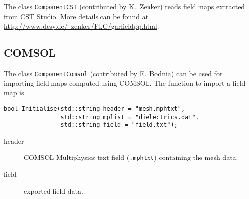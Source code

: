 The class \texttt{ComponentCST} (contributed by K.~Zenker) reads field maps 
extracted from CST Studio. More details can be found at 
\href{http://www.desy.de/~zenker/FLC/garfieldpp.html}{http://www.desy.de/~zenker/FLC/garfieldpp.html}.

\subsection{COMSOL}

The class \texttt{ComponentComsol} (contributed by E.~Bodnia) can be used for 
importing field maps computed using COMSOL.
The function to import a field map is 
\begin{lstlisting}
bool Initialise(std::string header = "mesh.mphtxt",
                std::string mplist = "dielectrics.dat",
                std::string field = "field.txt");
\end{lstlisting}
\begin{description}
  \item[header] COMSOL Multiphysics text field (\texttt{.mphtxt}) containing the mesh data.
  \item[field] exported field data. 
\end{description}

